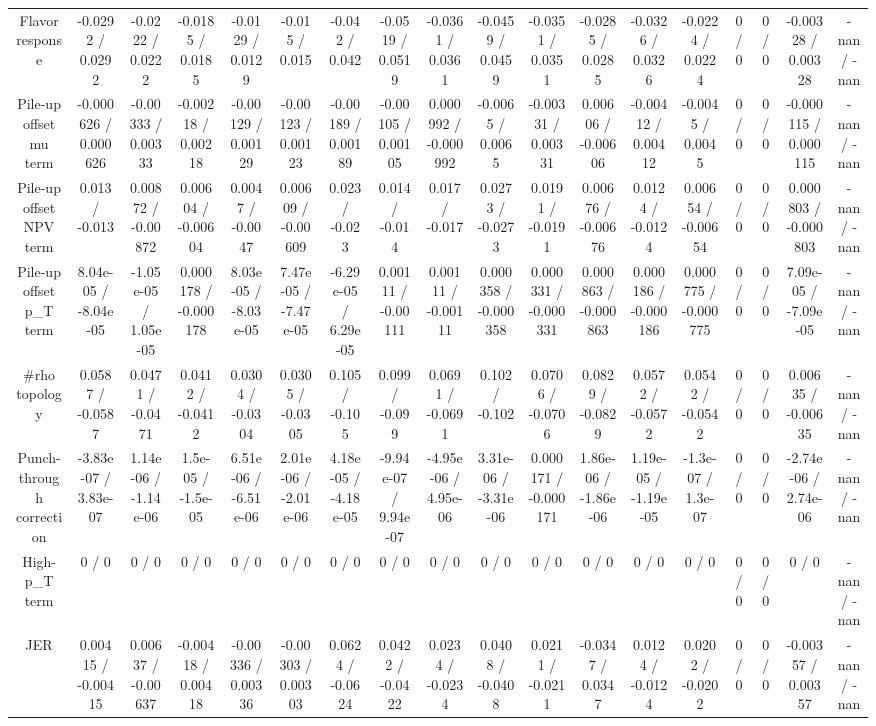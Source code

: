 \documentclass[10pt]{article}
\begin{document}
\begin{table}[htbp]
\begin{center}
\begin{tabular}{|c|c|c|c|c|c|c|c|c|c|c|c|c|c|c|c|c|c|}
  Flavor response & -0.0292 / 0.0292 & -0.0222 / 0.0222 & -0.0185 / 0.0185 & -0.0129 / 0.0129 & -0.015 / 0.015 & -0.042 / 0.042 & -0.0519 / 0.0519 & -0.0361 / 0.0361 & -0.0459 / 0.0459 & -0.0351 / 0.0351 & -0.0285 / 0.0285 & -0.0326 / 0.0326 & -0.0224 / 0.0224 & 0 / 0 & 0 / 0 & -0.00328 / 0.00328 & -nan / -nan \\ 
  Pile-up offset mu term & -0.000626 / 0.000626 & -0.00333 / 0.00333 & -0.00218 / 0.00218 & -0.00129 / 0.00129 & -0.00123 / 0.00123 & -0.00189 / 0.00189 & -0.00105 / 0.00105 & 0.000992 / -0.000992 & -0.0065 / 0.0065 & -0.00331 / 0.00331 & 0.00606 / -0.00606 & -0.00412 / 0.00412 & -0.0045 / 0.0045 & 0 / 0 & 0 / 0 & -0.000115 / 0.000115 & -nan / -nan \\ 
  Pile-up offset NPV term & 0.013 / -0.013 & 0.00872 / -0.00872 & 0.00604 / -0.00604 & 0.0047 / -0.0047 & 0.00609 / -0.00609 & 0.023 / -0.023 & 0.014 / -0.014 & 0.017 / -0.017 & 0.0273 / -0.0273 & 0.0191 / -0.0191 & 0.00676 / -0.00676 & 0.0124 / -0.0124 & 0.00654 / -0.00654 & 0 / 0 & 0 / 0 & 0.000803 / -0.000803 & -nan / -nan \\ 
  Pile-up offset p_{T} term & 8.04e-05 / -8.04e-05 & -1.05e-05 / 1.05e-05 & 0.000178 / -0.000178 & 8.03e-05 / -8.03e-05 & 7.47e-05 / -7.47e-05 & -6.29e-05 / 6.29e-05 & 0.00111 / -0.00111 & 0.00111 / -0.00111 & 0.000358 / -0.000358 & 0.000331 / -0.000331 & 0.000863 / -0.000863 & 0.000186 / -0.000186 & 0.000775 / -0.000775 & 0 / 0 & 0 / 0 & 7.09e-05 / -7.09e-05 & -nan / -nan \\ 
  #rho topology & 0.0587 / -0.0587 & 0.0471 / -0.0471 & 0.0412 / -0.0412 & 0.0304 / -0.0304 & 0.0305 / -0.0305 & 0.105 / -0.105 & 0.099 / -0.099 & 0.0691 / -0.0691 & 0.102 / -0.102 & 0.0706 / -0.0706 & 0.0829 / -0.0829 & 0.0572 / -0.0572 & 0.0542 / -0.0542 & 0 / 0 & 0 / 0 & 0.00635 / -0.00635 & -nan / -nan \\ 
  Punch-through correction & -3.83e-07 / 3.83e-07 & 1.14e-06 / -1.14e-06 & 1.5e-05 / -1.5e-05 & 6.51e-06 / -6.51e-06 & 2.01e-06 / -2.01e-06 & 4.18e-05 / -4.18e-05 & -9.94e-07 / 9.94e-07 & -4.95e-06 / 4.95e-06 & 3.31e-06 / -3.31e-06 & 0.000171 / -0.000171 & 1.86e-06 / -1.86e-06 & 1.19e-05 / -1.19e-05 & -1.3e-07 / 1.3e-07 & 0 / 0 & 0 / 0 & -2.74e-06 / 2.74e-06 & -nan / -nan \\ 
  High-p_{T} term & 0 / 0 & 0 / 0 & 0 / 0 & 0 / 0 & 0 / 0 & 0 / 0 & 0 / 0 & 0 / 0 & 0 / 0 & 0 / 0 & 0 / 0 & 0 / 0 & 0 / 0 & 0 / 0 & 0 / 0 & 0 / 0 & -nan / -nan \\ 
  JER & 0.00415 / -0.00415 & 0.00637 / -0.00637 & -0.00418 / 0.00418 & -0.00336 / 0.00336 & -0.00303 / 0.00303 & 0.0624 / -0.0624 & 0.0422 / -0.0422 & 0.0234 / -0.0234 & 0.0408 / -0.0408 & 0.0211 / -0.0211 & -0.0347 / 0.0347 & 0.0124 / -0.0124 & 0.0202 / -0.0202 & 0 / 0 & 0 / 0 & -0.00357 / 0.00357 & -nan / -nan \\ 

\end{tabular}
\end{center}
\end{table}
\end{document}
